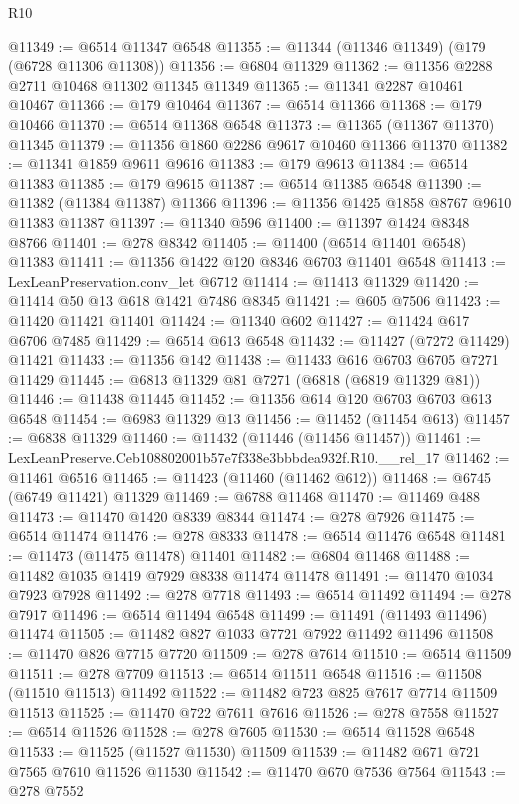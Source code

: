\begin{lexlean}{R10}
\begin{coremodule}
@11349 := @6514 @11347 @6548
@11355 := @11344 (@11346 @11349) (@179 (@6728 @11306 @11308))
@11356 := @6804 @11329
@11362 := @11356 @2288 @2711 @10468 @11302 @11345 @11349
@11365 := @11341 @2287 @10461 @10467
@11366 := @179 @10464
@11367 := @6514 @11366
@11368 := @179 @10466
@11370 := @6514 @11368 @6548
@11373 := @11365 (@11367 @11370) @11345
@11379 := @11356 @1860 @2286 @9617 @10460 @11366 @11370
@11382 := @11341 @1859 @9611 @9616
@11383 := @179 @9613
@11384 := @6514 @11383
@11385 := @179 @9615
@11387 := @6514 @11385 @6548
@11390 := @11382 (@11384 @11387) @11366
@11396 := @11356 @1425 @1858 @8767 @9610 @11383 @11387
@11397 := @11340 @596
@11400 := @11397 @1424 @8348 @8766
@11401 := @278 @8342
@11405 := @11400 (@6514 @11401 @6548) @11383
@11411 := @11356 @1422 @120 @8346 @6703 @11401 @6548
@11413 := LexLeanPreservation.conv_let @6712
@11414 := @11413 @11329
@11420 := @11414 @50 @13 @618 @1421 @7486 @8345
@11421 := @605 @7506
@11423 := @11420 @11421 @11401
@11424 := @11340 @602
@11427 := @11424 @617 @6706 @7485
@11429 := @6514 @613 @6548
@11432 := @11427 (@7272 @11429) @11421
@11433 := @11356 @142
@11438 := @11433 @616 @6703 @6705 @7271 @11429
@11445 := @6813 @11329 @81 @7271 (@6818 (@6819 @11329 @81))
@11446 := @11438 @11445
@11452 := @11356 @614 @120 @6703 @6703 @613 @6548
@11454 := @6983 @11329 @13
@11456 := @11452 (@11454 @613)
@11457 := @6838 @11329
@11460 := @11432 (@11446 (@11456 @11457))
@11461 := LexLeanPreserve.Ceb108802001b57e7f338e3bbbdea932f.R10.__rel_17
@11462 := @11461 @6516
@11465 := @11423 (@11460 (@11462 @612))
@11468 := @6745 (@6749 @11421) @11329
@11469 := @6788 @11468
@11470 := @11469 @488
@11473 := @11470 @1420 @8339 @8344
@11474 := @278 @7926
@11475 := @6514 @11474
@11476 := @278 @8333
@11478 := @6514 @11476 @6548
@11481 := @11473 (@11475 @11478) @11401
@11482 := @6804 @11468
@11488 := @11482 @1035 @1419 @7929 @8338 @11474 @11478
@11491 := @11470 @1034 @7923 @7928
@11492 := @278 @7718
@11493 := @6514 @11492
@11494 := @278 @7917
@11496 := @6514 @11494 @6548
@11499 := @11491 (@11493 @11496) @11474
@11505 := @11482 @827 @1033 @7721 @7922 @11492 @11496
@11508 := @11470 @826 @7715 @7720
@11509 := @278 @7614
@11510 := @6514 @11509
@11511 := @278 @7709
@11513 := @6514 @11511 @6548
@11516 := @11508 (@11510 @11513) @11492
@11522 := @11482 @723 @825 @7617 @7714 @11509 @11513
@11525 := @11470 @722 @7611 @7616
@11526 := @278 @7558
@11527 := @6514 @11526
@11528 := @278 @7605
@11530 := @6514 @11528 @6548
@11533 := @11525 (@11527 @11530) @11509
@11539 := @11482 @671 @721 @7565 @7610 @11526 @11530
@11542 := @11470 @670 @7536 @7564
@11543 := @278 @7552

\end{coremodule}
\end{lexlean}
